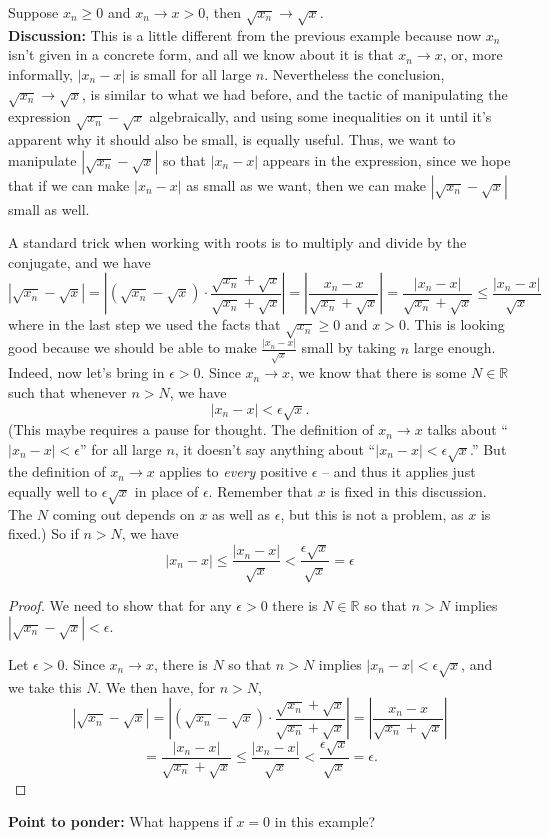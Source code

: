 \documentclass[11pt,dvipsnames]{book}
\def\R{\mathbb{R}}
\numberwithin{figure}{section} %
\numberwithin{table}{section} %
\begin{document}
\begin{example}\label{sqrootxn}
Suppose $x_{n}\geq 0$ and $x_{n}\rightarrow x>0$, then $\sqrt{x_{n}}\rightarrow \sqrt{x}$. \\

{\bf Discussion:} This is a little different from the previous example because now $x_n$ isn't given in a concrete form, and all we know about it is that $x_n \rightarrow x$, or, more informally, $|x_n - x|$ is small for all large $n$. Nevertheless the conclusion, $\sqrt{x_{n}}\rightarrow \sqrt{x}$, is similar to what we had before, and the tactic of manipulating the expression $\sqrt{x_{n}}-\sqrt{x}$ algebraically, and using some inequalities on it until it's apparent why it should also be small, is equally useful. Thus, we want to manipulate $|\sqrt{x_{n}}-\sqrt{x}|$ so that $|x_{n}-x|$ appears in the expression, since we hope that if we can make $|x_{n}-x|$ as small as we want, then we can make $|\sqrt{x_{n}}-\sqrt{x}|$ small as well.

A standard trick when working with roots is to multiply and divide by the conjugate, and we have
\[
|\sqrt{x_{n}}-\sqrt{x}|
=\left|(\sqrt{x_{n}}-\sqrt{x})\cdot \frac{\sqrt{x_{n}}+\sqrt{x}}{\sqrt{x_{n}}+\sqrt{x}}\right|
=\left|\frac{x_{n}-x}{\sqrt{x_{n}}+\sqrt{x}}\right|
=\frac{|x_{n}-x|}{\sqrt{x_{n}}+\sqrt{x}} \leq \frac{|x_{n}-x|}{\sqrt{x}}
\]
where in the last step we used the facts that $\sqrt{x_n} \geq 0$ and $x > 0$. This is looking good because we should be able to make
$\frac{|x_{n}-x|}{\sqrt{x}}$ small by taking $n$ large enough. Indeed, now let's bring in $\epsilon > 0$. Since $x_n \rightarrow x$, we know that there is some $N \in \mathbb{R}$ such that whenever $n > N$,
we have
\[ |x_n - x| <\epsilon\sqrt{x}.\]
(This maybe requires a pause for thought. The definition of $x_n \rightarrow x$ talks about ``$|x_n - x| < \epsilon$'' for all large $n$, it doesn't say anything about ``$ |x_n - x| <\epsilon\sqrt{x}$.'' But the definition of $x_n \rightarrow x$ applies to {\em every} positive $\epsilon$ -- and thus it applies just equally well to $\epsilon\sqrt{x}$
in place of $\epsilon$. Remember that $x$ is fixed in this discussion. The $N$ coming out depends on $x$ as well as $\epsilon$, but this is not a problem, as $x$ is fixed.)
So if $n > N$, we have
\[|x_n - x| \leq \frac{|x_n - x|}{\sqrt{x}} < \frac{\epsilon\sqrt{x}}{\sqrt{x}} = \epsilon
\]

\begin{proof}
We need to show that for any $\epsilon>0$ there is $N \in \R$ so that $n> N$ implies $|\sqrt{x_{n}}-\sqrt{x}|<\epsilon$.

Let $\epsilon>0$. Since $x_n\rightarrow x$, there is $N$ so that $n> N$ implies $|x_{n}-x|<\epsilon\sqrt{x}$, and we take this $N$. We then have, for $n > N$,
\[
|\sqrt{x_{n}}-\sqrt{x}|
=\left|(\sqrt{x_{n}}-\sqrt{x})\cdot \frac{\sqrt{x_{n}}+\sqrt{x}}{\sqrt{x_{n}}+\sqrt{x}}\right|
=\left|\frac{x_{n}-x}{\sqrt{x_{n}}+\sqrt{x}}\right|\]
\[=\frac{|x_{n}-x|}{\sqrt{x_{n}}+\sqrt{x}}
\leq \frac{|x_{n}-x|}{\sqrt{x}}
< \frac{\epsilon \sqrt{x}}{\sqrt{x}} = \epsilon.
\]
\end{proof}
\end{example}
{\bf Point to ponder:} What happens if $x = 0$ in this example?
\end{document}
